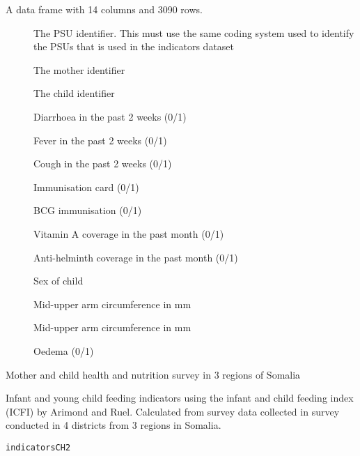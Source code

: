 \documentclass[a4paper]{book}
\begin{document}
%
\begin{Format}
A data frame with 14 columns and 3090 rows.
\begin{description}

\item[] The PSU identifier. This must use the same coding system
used to identify the PSUs that is used in the indicators dataset
\item[] The mother identifier
\item[] The child identifier
\item[] Diarrhoea in the past 2 weeks (0/1)
\item[] Fever in the past 2 weeks (0/1)
\item[] Cough in the past 2 weeks (0/1)
\item[] Immunisation card (0/1)
\item[] BCG immunisation (0/1)
\item[] Vitamin A coverage in the past month (0/1)
\item[] Anti-helminth coverage in the past month (0/1)
\item[] Sex of child
\item[] Mid-upper arm circumference in mm
\item[] Mid-upper arm circumference in mm
\item[] Oedema (0/1)

\end{description}
\end{Format}
%
\begin{Source}\relax
Mother and child health and nutrition survey in 3 regions of Somalia
\end{Source}
%
\begin{Description}\relax
Infant and young child feeding indicators using the infant and child feeding
index (ICFI) by Arimond and Ruel. Calculated from survey data collected in
survey conducted in 4 districts from 3 regions in Somalia.
\end{Description}
%
\begin{Usage}
\begin{verbatim}
indicatorsCH2
\end{verbatim}
\end{Usage}
%
\end{document}
